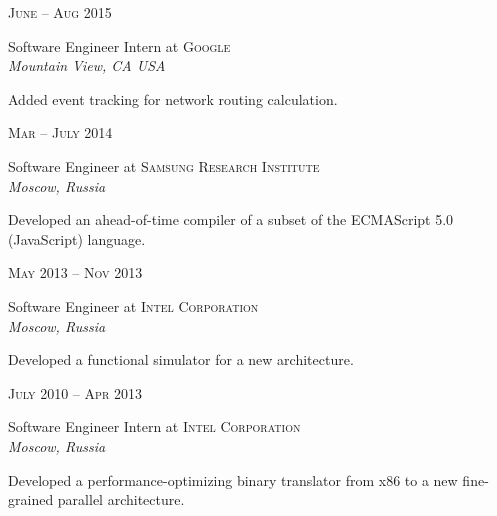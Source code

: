 \documentclass[10pt]{article} %
\begin{document}
\begin{minipage}[h]{0.5\textwidth}

{\raggedleft\textsc{June -- Aug 2015}\par}

{\raggedright\large Software Engineer Intern at \textsc{Google}\\
\textit{Mountain View, CA USA}\\[4pt]}

\normalsize{Added event tracking for network routing calculation.}\\


{\raggedleft\textsc{Mar -- July 2014}\par}

{\raggedright\large Software Engineer at \textsc{Samsung Research Institute}\\
\textit{Moscow, Russia}\\[4pt]}

\normalsize{Developed an ahead-of-time compiler of a subset of the ECMAScript 5.0 (JavaScript) language.}\\


{\raggedleft\textsc{May 2013 -- Nov 2013}\par}

{\raggedright\large Software Engineer at \textsc{Intel Corporation}\\
\textit{Moscow, Russia}\\[4pt]}

\normalsize{Developed a functional simulator for a new architecture.}\\


{\raggedleft\textsc{July 2010 -- Apr 2013}\par}

{\raggedright\large Software Engineer Intern at \textsc{Intel Corporation}\\
\textit{Moscow, Russia}\\[4pt]}

\normalsize{Developed a performance-optimizing binary translator from x86 to a new fine-grained parallel architecture.}\\


\end{minipage}
\end{document}
